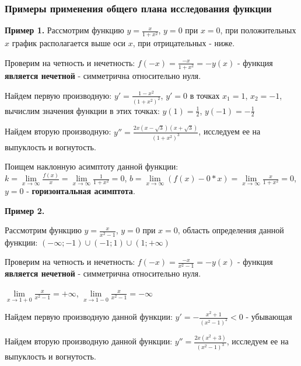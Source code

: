 \documentclass{article}
\begin{document}
\begin{flushleft}
\subsubsection{Примеры применения общего плана исследования функции}

\textbf{Пример 1.} Рассмотрим функцию $y = \frac{x}{1 + x^2}$, $y = 0$ при $x = 0$, при положительных $x$ график располагается выше оси $x$, при отрицательных - ниже.

Проверим на четность и нечетность: $f(-x) = \frac{-x}{1 + x^2} = -y(x)$ - функция \textbf{является нечетной} - симметрична относительно нуля.

Найдем первую производную: $y' = \frac{1 - x^2}{(1 + x^2)^2}$, $y' = 0$ в точках $x_1 = 1$, $x_2 = -1$, вычислим значения функции в этих точках: $y(1) = \frac{1}{2}$, $y(-1) = -\frac{1}{2}$

Найдем вторую производную: $y'' = \frac{2x(x-\sqrt{3})(x+\sqrt{3})}{(1 + x^2)^3}$, исследуем ее на выпуклость и вогнутость.

Поищем наклонную асимптоту данной функции: $k = \lim\limits_{x \to \infty} \frac{f(x)}{x} = \lim\limits_{x \to \infty} \frac{1}{1 + x^2} = 0$, $b = \lim\limits_{x \to \infty} (f(x) - 0 * x) = \lim\limits_{x \to \infty} \frac{x}{1 + x^2} = 0$, $y = 0$ - \textbf{горизонтальная асимптота}.

\hfill

\textbf{Пример 2.}

Рассмотрим функцию $y = \frac{x}{x^2 - 1}$, $y = 0$ при $x = 0$, область определения данной функции: $(-\infty; -1) \cup (-1; 1) \cup (1; +\infty)$

Проверим на четность и нечетность: $f(-x) = \frac{-x}{x^2 - 1} = -y(x)$ - функция \textbf{является нечетной} - симметрична относительно нуля.

$\lim\limits_{x \to 1 + 0} \frac{x}{x^2 - 1} = +\infty$, $\lim\limits_{x \to 1 - 0} \frac{x}{x^2 - 1} = -\infty$

Найдем первую производную данной функции: $y' = - \frac{x^2 + 1}{(x^2 - 1)^2} < 0$ - убывающая 

Найдем вторую производную данной функции: $y'' = \frac{2x(x^2 + 3)}{(x^2 - 1)^3}$, исследуем ее на выпуклость и вогнутость.

\end{flushleft}
\end{document}
